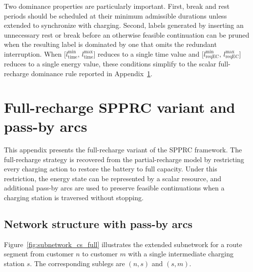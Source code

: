 \documentclass[3p,11pt,authoryear]{elsarticle}  %
\begin{document}
Two dominance properties are particularly important. First, break and rest periods should be scheduled at their minimum admissible durations unless extended to synchronize with charging. Second, labels generated by inserting an unnecessary rest or break before an otherwise feasible continuation can be pruned when the resulting label is dominated by one that omits the redundant interruption. When \(\bigl[l_{\text{time}}^{\min},\, l_{\text{time}}^{\max}\bigr]\) reduces to a single time value and \(\bigl[l_{\text{reqEC}}^{\min},\, l_{\text{reqEC}}^{\max}\bigr]\) reduces to a single energy value, these conditions simplify to the scalar full-recharge dominance rule reported in Appendix~\ref{app:full_recharge_spprc}.



\section{Full-recharge SPPRC variant and pass-by arcs}
\label{app:full_recharge_spprc}


This appendix presents the full-recharge variant of the SPPRC framework. The full-recharge strategy is recovered from the partial-recharge model by restricting every charging action to restore the battery to full capacity. Under this restriction, the energy state can be represented by a scalar resource, and additional pass-by arcs are used to preserve feasible continuations when a charging station is traversed without stopping.


\subsection{Network structure with pass-by arcs}


Figure~\ref{fig:subnetwork_cs_full} illustrates the extended subnetwork for a route segment from customer \(n\) to customer \(m\) with a single intermediate charging station \(s\). The corresponding sublegs are \((n,s)\) and \((s,m)\).
\end{document}
